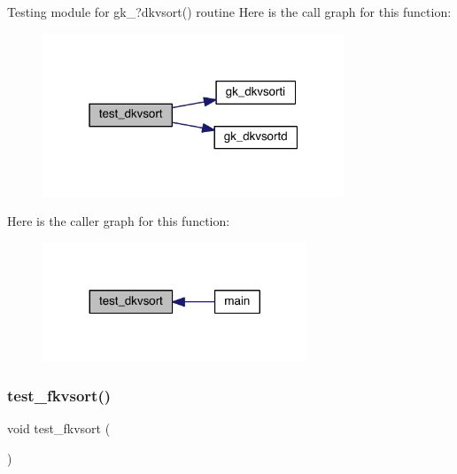 Testing module for gk\+\_\+?dkvsort() routine Here is the call graph for this function\+:\nopagebreak
\begin{figure}[H]
\begin{center}
\leavevmode
\includegraphics[width=256pt]{a00152_a91e0ce6fc88d5ab6695cda68dc4e79b5_cgraph}
\end{center}
\end{figure}
Here is the caller graph for this function\+:\nopagebreak
\begin{figure}[H]
\begin{center}
\leavevmode
\includegraphics[width=224pt]{a00152_a91e0ce6fc88d5ab6695cda68dc4e79b5_icgraph}
\end{center}
\end{figure}
\mbox{\label{a00152_a179814629e9b2ff14387734d6ac52a38}} 
\subsubsection{\texorpdfstring{test\+\_\+fkvsort()}{test\_fkvsort()}}
{\footnotesize\ttfamily void test\+\_\+fkvsort (\begin{DoxyParamCaption}{ }\end{DoxyParamCaption})}

